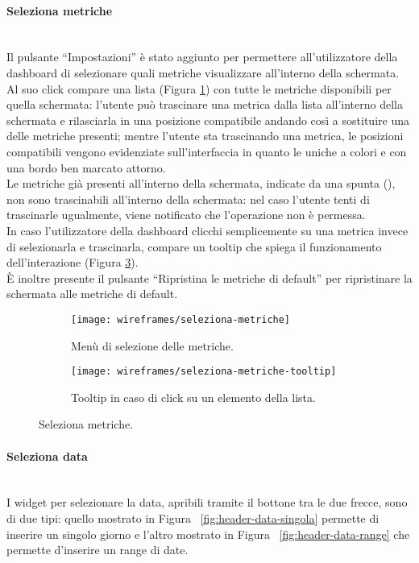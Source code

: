 \documentclass[../../../main.tex]{subfiles}
\begin{document}
\paragraph{Seleziona metriche}\mbox{}\\
Il pulsante ``Impostazioni'' è stato aggiunto per permettere all'utilizzatore della dashboard di selezionare quali metriche visualizzare all'interno della schermata. Al suo click compare una lista (Figura \ref{fig:seleziona-metriche}) con tutte le metriche disponibili per quella schermata: l'utente può trascinare una metrica dalla lista all'interno della schermata e rilasciarla in una posizione compatibile andando così a sostituire una delle metriche presenti; mentre l'utente sta trascinando una metrica, le posizioni compatibili vengono evidenziate sull'interfaccia in quanto le uniche a colori e con una bordo ben marcato attorno.\\
Le metriche già presenti all'interno della schermata, indicate da una spunta (\checkmark), non sono trascinabili all'interno della schermata: nel caso l'utente tenti di trascinarle ugualmente, viene notificato che l'operazione non è permessa.\\
In caso l'utilizzatore della dashboard clicchi semplicemente su una metrica invece di selezionarla e trascinarla, compare un tooltip che spiega il funzionamento dell'interazione (Figura \ref{fig:seleziona-metriche-tooltip}).\\
\`E inoltre presente il pulsante ``Ripristina le metriche di default'' per ripristinare la schermata alle metriche di default.

\begin{figure}[H]
    \begin{subfigure}[b]{0.5\textwidth}
        \centering
        \texttt{[image: wireframes/seleziona-metriche]}
        \caption{Menù di selezione delle metriche.}
        \label{fig:seleziona-metriche}
    \end{subfigure}
\hfill
    \begin{subfigure}[b]{0.5\textwidth}
        \centering
        \texttt{[image: wireframes/seleziona-metriche-tooltip]}
        \caption{Tooltip in caso di click su un elemento della lista.}
        \label{fig:seleziona-metriche-tooltip}
    \end{subfigure}
    \caption{Seleziona metriche.}
\end{figure}


\paragraph{Seleziona data}\mbox{}\\
I widget per selezionare la data, apribili tramite il bottone tra le due frecce, sono di due tipi: quello mostrato in Figura ~\ref{fig:header-data-singola} permette di inserire un singolo giorno e l'altro mostrato in Figura ~\ref{fig:header-data-range} che permette d'inserire un range di date.\\
\end{document}
